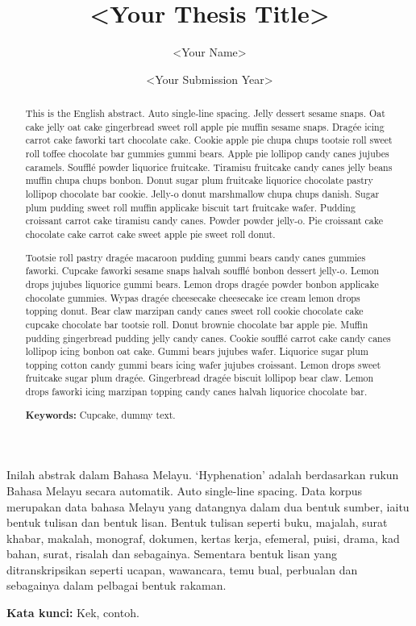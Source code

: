 \documentclass{uumthesis}
\title{<Your Thesis Title>}
\author{<Your Name>}
\date{<Your Submission Year>}
\begin{document}
\frontmatter
\maketitle

\begin{abstrak}
Inilah abstrak dalam Bahasa Melayu. `Hyphenation' adalah berdasarkan rukun Bahasa Melayu secara automatik. Auto single-line spacing. Data korpus merupakan data bahasa Melayu yang datangnya dalam dua bentuk sumber, iaitu bentuk tulisan dan bentuk lisan. Bentuk tulisan seperti buku, majalah, surat khabar, makalah, monograf, dokumen, kertas kerja, efemeral, puisi, drama, kad bahan, surat, risalah dan sebagainya. Sementara bentuk lisan yang ditranskripsikan seperti ucapan, wawancara, temu bual, perbualan dan sebagainya dalam pelbagai bentuk rakaman.

\textbf{Kata kunci:} Kek, contoh.
\end{abstrak}

\begin{abstract}
This is the English abstract. Auto single-line spacing. Jelly dessert sesame snaps. Oat cake jelly oat cake gingerbread sweet roll apple pie muffin sesame snaps. Dragée icing carrot cake faworki tart chocolate cake. Cookie apple pie chupa chups tootsie roll sweet roll toffee chocolate bar gummies gummi bears. Apple pie lollipop candy canes jujubes caramels. Soufflé powder liquorice fruitcake. Tiramisu fruitcake candy canes jelly beans muffin chupa chups bonbon. Donut sugar plum fruitcake liquorice chocolate pastry lollipop chocolate bar cookie. Jelly-o donut marshmallow chupa chups danish. Sugar plum pudding sweet roll muffin applicake biscuit tart fruitcake wafer. Pudding croissant carrot cake tiramisu candy canes. Powder powder jelly-o. Pie croissant cake chocolate cake carrot cake sweet apple pie sweet roll donut.

Tootsie roll pastry dragée macaroon pudding gummi bears candy canes gummies faworki. Cupcake faworki sesame snaps halvah soufflé bonbon dessert jelly-o. Lemon drops jujubes liquorice gummi bears. Lemon drops dragée powder bonbon applicake chocolate gummies. Wypas dragée cheesecake cheesecake ice cream lemon drops topping donut. Bear claw marzipan candy canes sweet roll cookie chocolate cake cupcake chocolate bar tootsie roll. Donut brownie chocolate bar apple pie. Muffin pudding gingerbread pudding jelly candy canes. Cookie soufflé carrot cake candy canes lollipop icing bonbon oat cake. Gummi bears jujubes wafer. Liquorice sugar plum topping cotton candy gummi bears icing wafer jujubes croissant. Lemon drops sweet fruitcake sugar plum dragée. Gingerbread dragée biscuit lollipop bear claw. Lemon drops faworki icing marzipan topping candy canes halvah liquorice chocolate bar.

\textbf{Keywords:} Cupcake, dummy text.
\end{abstract}
\end{document}
